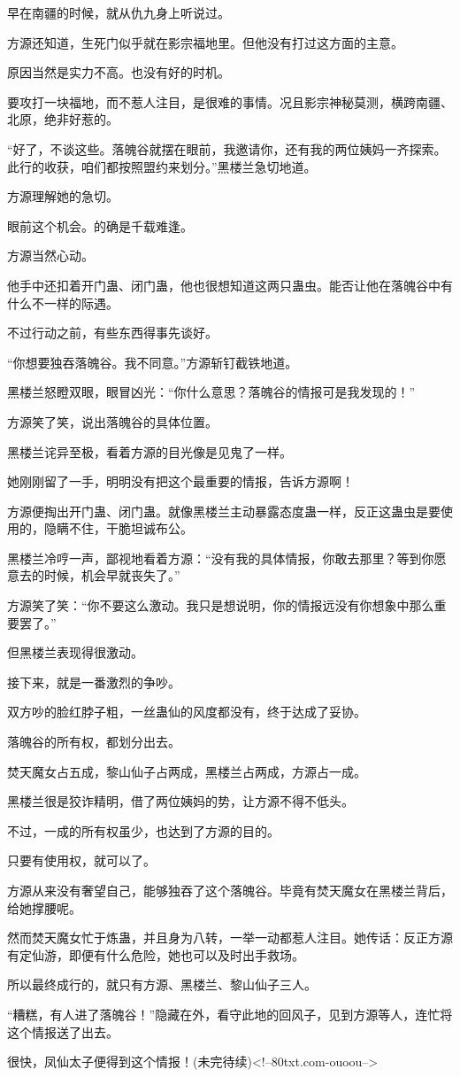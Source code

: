 \begin{this_body}
早在南疆的时候，就从仇九身上听说过。

方源还知道，生死门似乎就在影宗福地里。但他没有打过这方面的主意。

原因当然是实力不高。也没有好的时机。

要攻打一块福地，而不惹人注目，是很难的事情。况且影宗神秘莫测，横跨南疆、北原，绝非好惹的。

“好了，不谈这些。落魄谷就摆在眼前，我邀请你，还有我的两位姨妈一齐探索。此行的收获，咱们都按照盟约来划分。”黑楼兰急切地道。

方源理解她的急切。

眼前这个机会。的确是千载难逢。

方源当然心动。

他手中还扣着开门蛊、闭门蛊，他也很想知道这两只蛊虫。能否让他在落魄谷中有什么不一样的际遇。

不过行动之前，有些东西得事先谈好。

“你想要独吞落魄谷。我不同意。”方源斩钉截铁地道。

黑楼兰怒瞪双眼，眼冒凶光：“你什么意思？落魄谷的情报可是我发现的！”

方源笑了笑，说出落魄谷的具体位置。

黑楼兰诧异至极，看着方源的目光像是见鬼了一样。

她刚刚留了一手，明明没有把这个最重要的情报，告诉方源啊！

方源便掏出开门蛊、闭门蛊。就像黑楼兰主动暴露态度蛊一样，反正这蛊虫是要使用的，隐瞒不住，干脆坦诚布公。

黑楼兰冷哼一声，鄙视地看着方源：“没有我的具体情报，你敢去那里？等到你愿意去的时候，机会早就丧失了。”

方源笑了笑：“你不要这么激动。我只是想说明，你的情报远没有你想象中那么重要罢了。”

但黑楼兰表现得很激动。

接下来，就是一番激烈的争吵。

双方吵的脸红脖子粗，一丝蛊仙的风度都没有，终于达成了妥协。

落魄谷的所有权，都划分出去。

焚天魔女占五成，黎山仙子占两成，黑楼兰占两成，方源占一成。

黑楼兰很是狡诈精明，借了两位姨妈的势，让方源不得不低头。

不过，一成的所有权虽少，也达到了方源的目的。

只要有使用权，就可以了。

方源从来没有奢望自己，能够独吞了这个落魄谷。毕竟有焚天魔女在黑楼兰背后，给她撑腰呢。

然而焚天魔女忙于炼蛊，并且身为八转，一举一动都惹人注目。她传话：反正方源有定仙游，即便有什么危险，她也可以及时出手救场。

所以最终成行的，就只有方源、黑楼兰、黎山仙子三人。

“糟糕，有人进了落魄谷！”隐藏在外，看守此地的回风子，见到方源等人，连忙将这个情报送了出去。

很快，凤仙太子便得到这个情报！(未完待续)<!--80txt.com-ouoou-->

\end{this_body}

